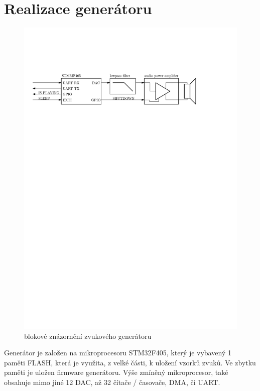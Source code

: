 \section{Realizace generátoru}
\begin{figure}[H]
    \begin{center}
        \includegraphics[width=\textwidth]{img/sound-system}
    \end{center}
    \caption{blokové znázornění zvukového generátoru}
\end{figure}

Generátor je založen na mikroprocesoru STM32F405, který je vybavený 1~ paměti FLASH, která je využita, z velké části, k uložení vzorků zvuků. Ve zbytku paměti je uložen firmware generátoru. Výše zmíněný mikroprocesor, také obsahuje mimo jiné 12 DAC, až 32 čítače / časovače, DMA, či
UART.

